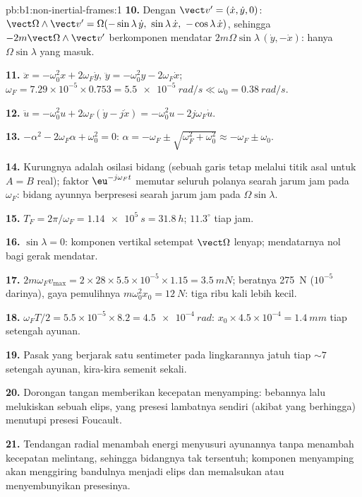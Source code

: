 \begin{solution}{pb:b1:non-inertial-frames:1}
\textbf{10.} Dengan $\vect v' = (\dot x, \dot y, 0)$:
$\vect\Omega\wedge\vect v' = \Omega(-\sin\lambda\,\dot y,\ \sin\lambda\,\dot x,\ -\cos\lambda\,\dot x)$,
sehingga $-2m\vect\Omega\wedge\vect v'$ berkomponen mendatar
$2m\Omega\sin\lambda\,(\dot y, -\dot x)$: hanya $\Omega\sin\lambda$ yang masuk.

\textbf{11.} $\ddot x = -\omega_0^2x + 2\omega_F\dot y$, $\ddot y = -\omega_0^2y -
2\omega_F\dot x$; $\omega_F = 7.29\times10^{-5} \times 0.753 = \qty{5.5e-5}{rad/s}
\ll \omega_0 = \qty{0.38}{rad/s}$.

\textbf{12.} $\ddot u = -\omega_0^2u + 2\omega_F(\dot y - j\dot x) = -\omega_0^2u -
2j\omega_F\dot u$.

\textbf{13.} $-\alpha^2 - 2\omega_F\alpha + \omega_0^2 = 0$: $\alpha = -\omega_F \pm
\sqrt{\omega_F^2 + \omega_0^2} \approx -\omega_F \pm \omega_0$.

\textbf{14.} Kurungnya adalah osilasi bidang (sebuah garis tetap melalui
titik asal untuk $A = B$ real); faktor $\eu^{-j\omega_Ft}$ memutar seluruh
polanya searah jarum jam pada $\omega_F$: bidang ayunnya berpresesi searah jarum jam pada
$\Omega\sin\lambda$.

\textbf{15.} $T_F = 2\pi/\omega_F = \qty{1.14e5}{s} = \qty{31.8}{h}$; $11.3^\circ$
tiap jam.

\textbf{16.} $\sin\lambda = 0$: komponen vertikal setempat $\vect\Omega$
lenyap;  mendatarnya nol bagi gerak mendatar.

\textbf{17.} $2m\omega_Fv_{\max} = 2 \times 28 \times 5.5\times10^{-5} \times 1.15 =
\qty{3.5}{mN}$; beratnya \qty{275}{N} ($10^{-5}$ darinya), gaya pemulihnya
$m\omega_0^2x_0 = \qty{12}{N}$: tiga ribu kali lebih kecil.

\textbf{18.} $\omega_FT/2 = 5.5\times10^{-5} \times 8.2 = \qty{4.5e-4}{rad}$:
$x_0 \times 4.5\times10^{-4} = \qty{1.4}{mm}$ tiap setengah ayunan.

\textbf{19.} Pasak yang berjarak satu sentimeter pada lingkarannya jatuh tiap $\sim 7$
setengah ayunan, kira-kira semenit sekali.

\textbf{20.} Dorongan tangan memberikan kecepatan menyamping: bebannya lalu
melukiskan sebuah elips, yang presesi lambatnya sendiri (akibat 
yang berhingga) menutupi presesi Foucault.

\textbf{21.} Tendangan radial menambah energi menyusuri ayunannya tanpa menambah
kecepatan melintang, sehingga bidangnya tak tersentuh; komponen menyamping
akan menggiring bandulnya menjadi elips dan memalsukan atau menyembunyikan
presesinya.


\end{solution}
